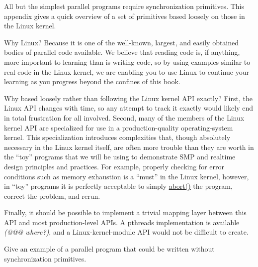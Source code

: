 

All but the simplest parallel programs require synchronization
primitives.
This appendix gives a quick overview of a set of primitives based
loosely on those in the Linux kernel.

Why Linux?
Because it is one of the well-known, largest, and easily obtained
bodies of parallel code available.
We believe that reading code is, if anything, more important to learning
than is writing code, so by using examples similar to real code in
the Linux kernel, we are enabling you to use Linux to continue your
learning as you progress beyond the confines of this book.

Why based loosely rather than following the Linux kernel API exactly?
First, the Linux API changes with time, so any attempt to track it
exactly would likely end in total frustration for all involved.
Second, many of the members of the Linux kernel API are specialized for
use in a production-quality operating-system kernel.
This specialization introduces complexities that, though absolutely
necessary in the Linux kernel itself, are often more trouble than they are
worth in the ``toy'' programs that we will be using to demonstrate
SMP and realtime design principles and practices.
For example, properly checking for error conditions such as memory
exhaustion is a ``must'' in the Linux kernel, however, in ``toy'' programs
it is perfectly acceptable to simply \url{abort()} the program,
correct the problem, and rerun.

Finally, it should be possible to implement a trivial mapping layer between
this API and most production-level APIs.
A pthreads implementation is available \emph{(@@@ where?)}, and
a Linux-kernel-module API would not be difficult to create.

\QuickQuiz{}
	Give an example of a parallel program that could be written
	without synchronization primitives.
 \QuickQuizEnd

